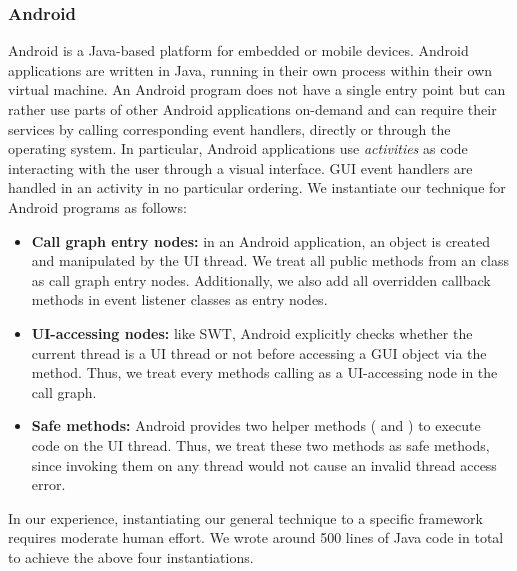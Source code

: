 \subsubsection{Android}

Android is a Java-based platform for embedded or mobile devices. 
Android applications are written in Java, running in their own process within their own virtual machine.
An Android program does not have a single entry point but can
rather use parts of other Android applications on-demand and can require their
services by calling corresponding event handlers, directly or through the
operating system. In particular, Android applications use \textit{activities}
as code interacting with the user through a visual interface. GUI event handlers
are handled in an activity  in no particular ordering.
We instantiate our technique for Android programs as follows:



\begin{itemize}

\item \textbf{Call graph entry nodes: } in an Android application,
an  object is created and manipulated by the UI thread. We treat
all public methods from an  class as call graph entry nodes. Additionally,
we also add all overridden callback methods in event listener classes as entry nodes.

\item \textbf{UI-accessing nodes: } like SWT, Android explicitly checks whether
the current thread is a UI thread or not before accessing a GUI object via
the  method.
Thus, we treat every methods calling  as a UI-accessing node
in the call graph.

\item \textbf{Safe methods: } Android provides two helper methods (
and ) to execute code on the UI thread. Thus, we treat
these two methods as safe methods, since invoking them on any thread
would not cause an invalid thread access error.

\end{itemize}


In our experience, instantiating our general technique to  a specific framework
requires moderate human effort. We wrote around 500 lines of Java code in total to achieve
the above four instantiations.
